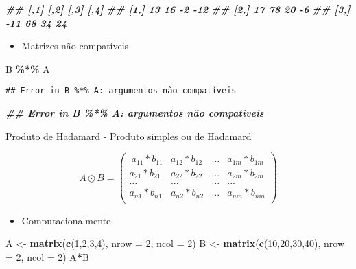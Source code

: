 \documentclass[
]{article}
\newenvironment{Shaded}{\begin{snugshade}}{\end{snugshade}}
\newcommand{\AttributeTok}[1]{\textcolor[rgb]{0.13,0.29,0.53}{#1}}
\newcommand{\DecValTok}[1]{\textcolor[rgb]{0.00,0.00,0.81}{#1}}
\newcommand{\DocumentationTok}[1]{\textcolor[rgb]{0.56,0.35,0.01}{\textbf{\textit{#1}}}}
\newcommand{\FunctionTok}[1]{\textcolor[rgb]{0.13,0.29,0.53}{\textbf{#1}}}
\newcommand{\NormalTok}[1]{#1}
\newcommand{\OtherTok}[1]{\textcolor[rgb]{0.56,0.35,0.01}{#1}}
\newcommand{\SpecialCharTok}[1]{\textcolor[rgb]{0.81,0.36,0.00}{\textbf{#1}}}
\providecommand{\tightlist}{%
  \setlength{\itemsep}{0pt}\setlength{\parskip}{0pt}}
\begin{document}
\begin{Shaded}
\begin{Highlighting}[]
\DocumentationTok{\#\# [,1] [,2] [,3] [,4]}
\DocumentationTok{\#\# [1,] 13 16 {-}2 {-}12}
\DocumentationTok{\#\# [2,] 17 78 20 {-}6}
\DocumentationTok{\#\# [3,] {-}11 68 34 24}
\end{Highlighting}
\end{Shaded}

\begin{itemize}
\tightlist
\item
  Matrizes não compatíveis
\end{itemize}

\begin{Shaded}
\begin{Highlighting}[]
\NormalTok{B }\SpecialCharTok{\%*\%}\NormalTok{ A}
\end{Highlighting}
\end{Shaded}

\begin{verbatim}
## Error in B %*% A: argumentos não compatíveis
\end{verbatim}

\begin{Shaded}
\begin{Highlighting}[]
\DocumentationTok{\#\# Error in B \%*\% A: argumentos não compatíveis}
\end{Highlighting}
\end{Shaded}

Produto de Hadamard - Produto simples ou de Hadamard

\[A \odot B = \begin{pmatrix}\
a_{11}*b_{11} & a_{12}*b_{12} & ... & a_{1m}*b_{1m}\\
a_{21}*b_{21} & a_{22}*b_{22} & ... & a_{2m}*b_{2m}\\
... & ... & ... & ... \\
a_{n1}*b_{n1} & a_{n2}*b_{n2} & ... & a_{nm}*b_{nm}\\
\end{pmatrix}\]

\begin{itemize}
\tightlist
\item
  Computacionalmente
\end{itemize}

\begin{Shaded}
\begin{Highlighting}[]
\NormalTok{A }\OtherTok{\textless{}{-}} \FunctionTok{matrix}\NormalTok{(}\FunctionTok{c}\NormalTok{(}\DecValTok{1}\NormalTok{,}\DecValTok{2}\NormalTok{,}\DecValTok{3}\NormalTok{,}\DecValTok{4}\NormalTok{),}
\AttributeTok{nrow =} \DecValTok{2}\NormalTok{, }\AttributeTok{ncol =} \DecValTok{2}\NormalTok{)}
\NormalTok{B }\OtherTok{\textless{}{-}} \FunctionTok{matrix}\NormalTok{(}\FunctionTok{c}\NormalTok{(}\DecValTok{10}\NormalTok{,}\DecValTok{20}\NormalTok{,}\DecValTok{30}\NormalTok{,}\DecValTok{40}\NormalTok{),}
\AttributeTok{nrow =} \DecValTok{2}\NormalTok{, }\AttributeTok{ncol =} \DecValTok{2}\NormalTok{)}
\NormalTok{A}\SpecialCharTok{*}\NormalTok{B}
\end{Highlighting}
\end{Shaded}
\end{document}
